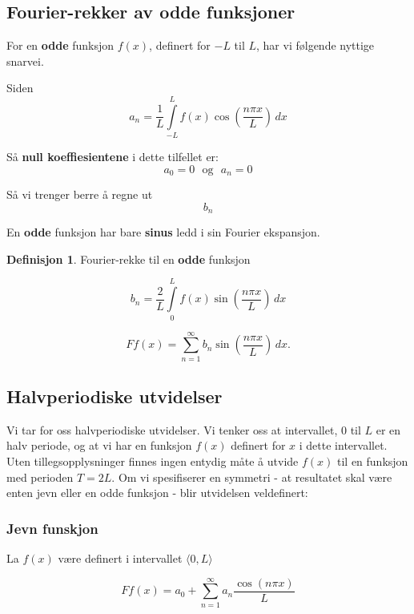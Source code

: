 \documentclass[11pt]{article}
\theoremstyle{definition}
\newtheorem{mindef}{Definisjon}[section]
\newenvironment{fmindef}
{\begin{mdframed}[style=minstil]\begin{mindef}}
		{\end{mindef}\end{mdframed}}
\theoremstyle{definition}
\theoremstyle{definition}
\theoremstyle{definition}
\theoremstyle{definition}
\theoremstyle{definition}
\begin{document}
		
		\newpage


		\subsection{Fourier-rekker av odde funksjoner}
		
		For en \textbf{odde} funksjon \(f(x)\), definert for \(-L\) til \(L\), har vi følgende nyttige snarvei.
		
		Siden \[a_n=\dfrac{1}{L}\int\limits_{-L}^{L}f(x)\cos\left(\dfrac{n\pi x}{L} \right)\, dx   \]
		
		Så \textbf{null koeffiesientene} i dette tilfellet er: \[a_0=0 \,\,\text{ og } \,\, a_n=0\]
		
		Så vi trenger berre å regne ut \[b_n\]
		
		En \textbf{odde} funksjon har bare \textbf{sinus} ledd i sin Fourier ekspansjon.
		
		\begin{fmindef}
			Fourier-rekke til en \textbf{odde} funksjon
			
			\[b_n=\dfrac{2}{L}\int\limits_{0}^{L}f(x)\sin \left( \dfrac{n\pi x}{L} \right) \, dx \]
			
			\[Ff(x)=\sum_{n=1}^{\infty}b_n \sin \left( \dfrac{n\pi x}{L} \right)\, dx.  \]
		\end{fmindef}
		
		
		
		\newpage		
		
		\subsection{Halvperiodiske utvidelser}
		
		Vi tar for oss halvperiodiske utvidelser. Vi tenker oss at intervallet, \(0 \) til \(L\) er en halv periode, og at vi har en funksjon \(f(x)\) definert for \(x\) i dette intervallet. Uten tillegsopplysninger finnes ingen entydig måte å utvide \(f(x)\) til en funksjon med perioden \(T=2L\). Om vi spesifiserer en symmetri - at resultatet skal være enten jevn eller en odde funksjon - blir utvidelsen veldefinert:
		
		
		\subsubsection{Jevn funskjon}
		
		La \(f(x)\) være definert i intervallet \(\langle 0,L \rangle\)
		
		\[Ff(x)=a_0+\sum_{n=1}^{\infty}a_n\dfrac{\cos (n\pi x)}{L} \]
		
\end{document}
